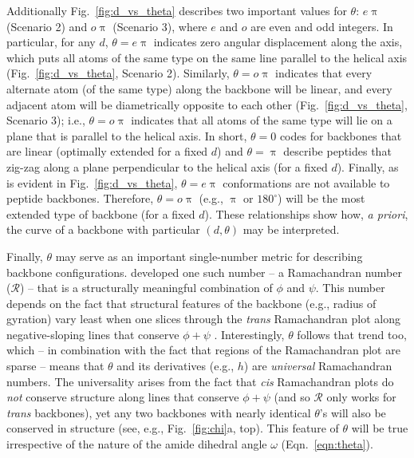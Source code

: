 \documentclass[fleqn,10pt,lineno]{wlpeerj} %
\newcommand{\n}[1]{{\color{black}#1}} %
\newcommand{\Fig}[1]{Fig.~\ref{#1}}
\newcommand{\Eqn}[1]{Eqn.~\ref{#1}}
\newcommand{\h}{h}
\newcommand{\cis}{{\em{cis}}\xspace}
\newcommand{\trans}{{\em{trans}}\xspace}
\begin{document}
Additionally \Fig{fig:d_vs_theta} describes two important values for $\theta$: $e\uppi$ \n{(Scenario 2)} and $o\uppi$ \n{(Scenario 3)}, where $e$ and $o$ are even and odd integers. In particular, for any $d$, $\theta=e\uppi$ indicates zero angular displacement along the axis, which puts all atoms of the same type on the same line parallel to the helical axis (\Fig{fig:d_vs_theta}\n{, Scenario 2}). Similarly, $\theta=o\uppi$ indicates that every alternate atom (of the same type) along the backbone will be linear, and every adjacent atom will be diametrically opposite to each other (\Fig{fig:d_vs_theta}\n{, Scenario 3}); i.e., $\theta=o\uppi$ indicates that all atoms of the same type will lie on a plane that is parallel to the helical axis. In short, $\theta=0$ codes for backbones that are linear (optimally extended for a fixed $d$) and $\theta=\uppi$ describe peptides that zig-zag along a plane perpendicular to the helical axis (for a fixed $d$). Finally, as \n{is} evident in \Fig{fig:d_vs_theta}, $\theta=e\uppi$ conformations are not available \n{to} peptide backbones\n{. Therefore}, $\theta=o\uppi$ (e.g., $\uppi$ or $180^\circ$) will be the most extended type of backbone (for a fixed $d$). These relationships show how, {\em a priori}, the curve of a backbone with particular $(d,\theta)$ may be interpreted. 

Finally, $\theta$ may serve as an important single-number metric for describing backbone configurations. \cite{Mannige2016} developed one such number -- a Ramachandran number ($\mathcal{R}$) -- that \n{is a structurally meaningful combination of} $\phi$ and $\psi$. This number depends on the fact that structural features of the backbone (e.g., radius of gyration) vary least when one slices through the \trans Ramachandran plot along negative-sloping lines that conserve $\phi+\psi$ \citep{Ho2003,Zacharias2013,Mannige2016}. Interestingly, $\theta$ follows that trend too, which -- in combination with the fact that regions of the Ramachandran plot are sparse \citep{Mannige2016} -- means that $\theta$ and its derivatives (e.g., $\h$) are {\it universal} Ramachandran numbers. The universality arises from the fact that \cis Ramachandran plots do {\it not} conserve structure along lines that conserve $\phi+\psi$ (and so $\mathcal{R}$ only works for \trans backbones), yet any two backbones with nearly identical $\theta$'s will also be conserved in structure (see, e.g., \Fig{fig:chi}a, top). This feature of $\theta$ will be true irrespective of the nature of the amide dihedral angle $\omega$ (\Eqn{eqn:theta}).
\end{document}
